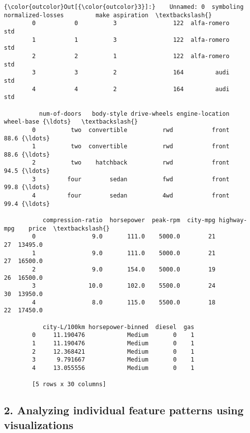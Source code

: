 \documentclass[11pt]{article}
\begin{document}
\begin{Verbatim}[commandchars=\\\{\}]
{\color{outcolor}Out[{\color{outcolor}3}]:}    Unnamed: 0  symboling  normalized-losses         make aspiration  \textbackslash{}
        0           0          3                122  alfa-romero        std   
        1           1          3                122  alfa-romero        std   
        2           2          1                122  alfa-romero        std   
        3           3          2                164         audi        std   
        4           4          2                164         audi        std   
        
          num-of-doors   body-style drive-wheels engine-location  wheel-base {\ldots}   \textbackslash{}
        0          two  convertible          rwd           front        88.6 {\ldots}    
        1          two  convertible          rwd           front        88.6 {\ldots}    
        2          two    hatchback          rwd           front        94.5 {\ldots}    
        3         four        sedan          fwd           front        99.8 {\ldots}    
        4         four        sedan          4wd           front        99.4 {\ldots}    
        
           compression-ratio  horsepower  peak-rpm  city-mpg highway-mpg    price  \textbackslash{}
        0                9.0       111.0    5000.0        21          27  13495.0   
        1                9.0       111.0    5000.0        21          27  16500.0   
        2                9.0       154.0    5000.0        19          26  16500.0   
        3               10.0       102.0    5500.0        24          30  13950.0   
        4                8.0       115.0    5500.0        18          22  17450.0   
        
           city-L/100km horsepower-binned  diesel  gas  
        0     11.190476            Medium       0    1  
        1     11.190476            Medium       0    1  
        2     12.368421            Medium       0    1  
        3      9.791667            Medium       0    1  
        4     13.055556            Medium       0    1  
        
        [5 rows x 30 columns]
\end{Verbatim}
            
    \subsection{2. Analyzing individual feature patterns using
visualizations}\label{analyzing-individual-feature-patterns-using-visualizations}
\end{document}
